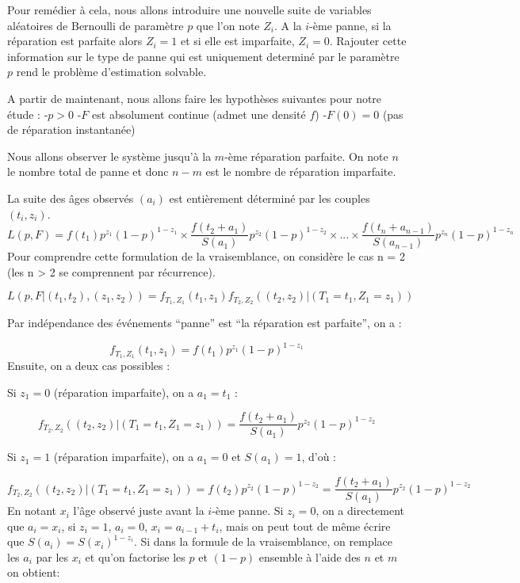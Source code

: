 \documentclass[
]{article}
\begin{document}
Pour remédier à cela, nous allons introduire une nouvelle suite de
variables aléatoires de Bernoulli de paramètre \(p\) que l'on note
\(Z_i\). A la \(i\)-ème panne, si la réparation est parfaite alors
\(Z_i=1\) et si elle est imparfaite, \(Z_i=0\). Rajouter cette
information sur le type de panne qui est uniquement determiné par le
paramètre \(p\) rend le problème d'estimation solvable.

A partir de maintenant, nous allons faire les hypothèses suivantes pour
notre étude : -\(p>0\) -\(F\) est absolument continue (admet une densité
\(f\)) -\(F(0)=0\) (pas de réparation instantanée)

Nous allons observer le système jusqu'à la \(m\)-ème réparation
parfaite. On note \(n\) le nombre total de panne et donc \(n-m\) est le
nombre de réparation imparfaite.

La suite des âges observés \((a_i)\) est entièrement déterminé par les
couples \((t_i,z_i)\). \[
L(p,F)=f(t_1)p^{z_1}(1-p)^{1-z_1}\times\frac{f(t_2+a_1)}{S(a_1)}p^{z_2}(1-p)^{1-z_2}\times ...\times\frac{f(t_n+a_{n-1})}{S(a_{n-1})}p^{z_n}(1-p)^{1-z_n}
\] Pour comprendre cette formulation de la vraisemblance, on considère
le cas n = 2 (les n \textgreater{} 2 se comprennent par récurrence).

\[
L(p,F|(t_1,t_2),(z_1, z_2))=f_{T_1,Z_1}(t_1, z_1)f_{T_2,Z_2}((t_2, z_2)|(T_1 = t_1, Z_1 = z_1))
\]

Par indépendance des événements ``panne'' est ``la réparation est
parfaite'', on a :

\[
f_{T_1,Z_1}(t_1, z_1) = f(t_1)p^{z_1}(1-p)^{1-z_1}
\] Ensuite, on a deux cas possibles :

Si \(z_1 = 0\) (réparation imparfaite), on a \(a_1 = t_1\) :

\[
f_{T_2,Z_2}((t_2, z_2)|(T_1 = t_1, Z_1 = z_1)) = \frac{f(t_2+a_1)}{S(a_1)} p^{z_2} (1-p)^{1-z_2}
\]

Si \(z_1 = 1\) (réparation imparfaite), on a \(a_1 = 0\) et
\(S(a_1) = 1\), d'où :

\[
f_{T_2,Z_2}((t_2, z_2)|(T_1 = t_1, Z_1 = z_1)) = f(t_2) p^{z_2} (1-p)^{1-z_2} = \frac{f(t_2+a_1)}{S(a_1)} p^{z_2} (1-p)^{1-z_2}
\] En notant \(x_i\) l'âge observé juste avant la \(i\)-ème panne. Si
\(z_i=0\), on a directement que \(a_i=x_i\), si \(z_i=1\), \(a_i=0\),
\(x_i=a_{i-1} +t_i\), mais on peut tout de même écrire que
\(S(a_i)=S(x_i)^{1-z_i}\). Si dans la formule de la vraisemblance, on
remplace les \(a_i\) par les \(x_i\) et qu'on factorise les \(p\) et
\((1-p)\) ensemble à l'aide des \(n\) et \(m\) on obtient:
\end{document}

